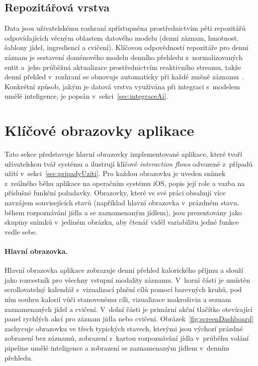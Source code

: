 \subsection{Repozitářová vrstva}
\label{subsec:repozitare}

Data jsou uživatelskému rozhraní zpřístupněna prostřednictvím pěti repozitářů odpovídajících věcným oblastem datového modelu (denní záznam, hmotnost, šablony jídel, ingrediencí a cvičení).
Klíčovou odpovědností repozitáře pro denní záznam je sestavení doménového modelu denního přehledu z~normalizovaných entit a~jeho průběžná aktualizace prostřednictvím reaktivního streamu, takže denní přehled v~rozhraní se obnovuje automaticky při každé změně záznamu~\cite{getxDoc}.
Konkrétní způsob, jakým je datová vrstva využívána při integraci s~modelem umělé inteligence, je popsán v~sekci~\ref{sec:integraceAi}.

\section{Klíčové obrazovky aplikace}
\label{sec:klicoveObrazovky}

Tato sekce představuje hlavní obrazovky implementované aplikace, které tvoří uživatelskou tvář systému a ilustrují klíčové \emph{interaction flows} odvozené z~případů užití v~sekci~\ref{sec:pripadyUziti}.
Pro každou obrazovku je uveden snímek z~reálného běhu aplikace na operačním systému iOS, popis její role a vazba na příslušné funkční požadavky.
Obrazovky, které ve své práci obsahují více navzájem souvisejících stavů (například hlavní obrazovka v~prázdném stavu, během rozpoznávání jídla a se zaznamenaným jídlem), jsou prezentovány jako skupiny snímků v~jediném obrázku, aby čtenář viděl variabilitu jedné funkce vedle sebe.

\paragraph{Hlavní obrazovka.}
Hlavní obrazovka aplikace zobrazuje denní přehled kalorického příjmu a slouží jako rozcestník pro všechny vstupní modality záznamu.
V~horní části je umístěn scrollovatelný kalendář s~vizualizací plnění cílů pomocí barevných kruhů, pod ním souhrn kalorií vůči stanovenému cíli, vizualizace makroživin a seznam zaznamenaných jídel a cvičení.
V~dolní části je primární akční tlačítko otevírající panel rychlých akcí pro záznam jídla nebo cvičení.
Obrázek~\ref{fig:screenDashboard} zachycuje obrazovku ve třech typických stavech, kterými jsou výchozí prázdné zobrazení bez záznamů, zobrazení s~kartou rozpoznávání jídla v~průběhu volání pipeline umělé inteligence a zobrazení se zaznamenaným jídlem v~denním přehledu.

